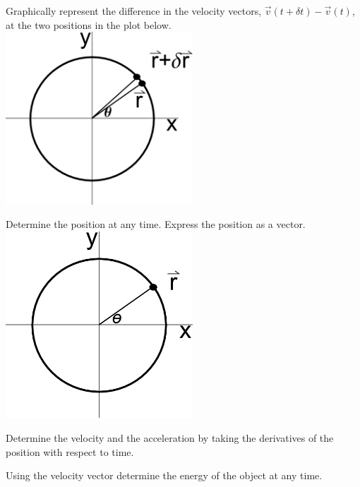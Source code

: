\begin{problem}
\begin{subproblem}
  \item Graphically represent the difference in the velocity vectors,
    $\vec{v}(t+\delta t)-\vec{v}(t)$, at the two positions in the plot below. \\
    \includegraphics[width=7cm]{ink/week12/circularAcceleration}
    \clearpage
  \item Determine the position at any time. Express the position as
    a vector.\\
    \includegraphics[width=7cm]{ink/week12/circularMotion}
    \vfill
  \item Determine the velocity and the acceleration by taking the
    derivatives of the position with respect to time.
    \vfill
  \item Using the velocity vector determine the energy of the object
    at any time.
    \vfill
  \end{subproblem}
\end{problem}

